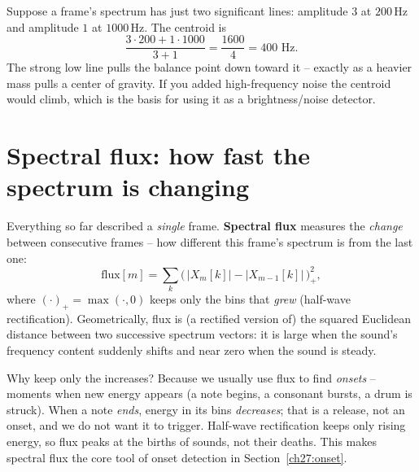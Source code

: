 \begin{example}
\label{ch27:ex-centroid}
Suppose a frame's spectrum has just two significant lines: amplitude $3$ at
$200$\,Hz and amplitude $1$ at $1000$\,Hz. The centroid is
\[
\frac{3\cdot 200 + 1\cdot 1000}{3 + 1} = \frac{1600}{4} = 400\text{ Hz}.
\]
The strong low line pulls the balance point down toward it -- exactly as a heavier
mass pulls a center of gravity. If you added high-frequency noise the centroid
would climb, which is the basis for using it as a brightness/noise detector.
\end{example}

\section{Spectral flux: how fast the spectrum is changing}
\label{ch27:flux}

Everything so far described a \emph{single} frame. \textbf{Spectral flux} measures
the \emph{change} between consecutive frames -- how different this frame's spectrum
is from the last one:
\begin{equation}
\label{ch27:flux-defn}
\text{flux}[m] = \sum_k \bigl(\, |X_m[k]| - |X_{m-1}[k]| \,\bigr)_{+}^2,
\end{equation}
where $(\cdot)_+ = \max(\cdot, 0)$ keeps only the bins that \emph{grew}
(half-wave rectification). Geometrically, flux is (a rectified version of) the
squared Euclidean distance between two successive spectrum vectors: it is large
when the sound's frequency content suddenly shifts and near zero when the sound is
steady.

\begin{whybox}
Why keep only the increases? Because we usually use flux to find \emph{onsets} --
moments when new energy appears (a note begins, a consonant bursts, a drum is
struck). When a note \emph{ends}, energy in its bins \emph{decreases}; that is a
release, not an onset, and we do not want it to trigger. Half-wave rectification
keeps only rising energy, so flux peaks at the births of sounds, not their deaths.
This makes spectral flux the core tool of onset detection in
Section~\ref{ch27:onset}.
\end{whybox}

